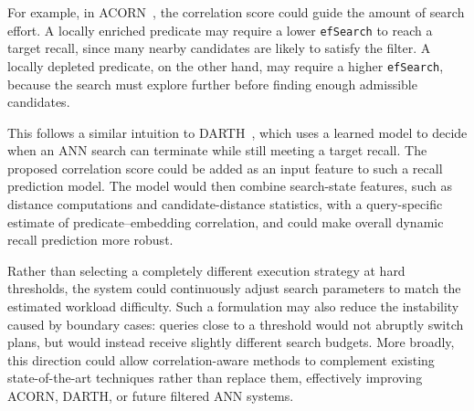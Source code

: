 For example, in ACORN~\cite{acorn}, the correlation score could guide the amount of search effort.
A locally enriched predicate may require a lower \texttt{efSearch} to reach a target recall, since many nearby candidates are likely to satisfy the filter.
A locally depleted predicate, on the other hand, may require a higher \texttt{efSearch}, because the search must explore further before finding enough admissible candidates.

This follows a similar intuition to DARTH~\cite{darth}, which uses a learned model to decide when an ANN search can terminate while still meeting a target recall.
The proposed correlation score could be added as an input feature to such a recall prediction model.
The model would then combine search-state features, such as distance computations and candidate-distance statistics, with a query-specific estimate of predicate--embedding correlation, 
and could make overall dynamic recall prediction more robust.

Rather than selecting a completely different execution strategy at hard thresholds, the system could continuously adjust search parameters to match the estimated workload difficulty.
Such a formulation may also reduce the instability caused by boundary cases: queries close to a threshold would not abruptly switch plans, but would instead receive slightly different search budgets.
More broadly, this direction could allow correlation-aware methods to complement existing state-of-the-art techniques rather than replace them, effectively improving ACORN, DARTH, or future filtered ANN systems.